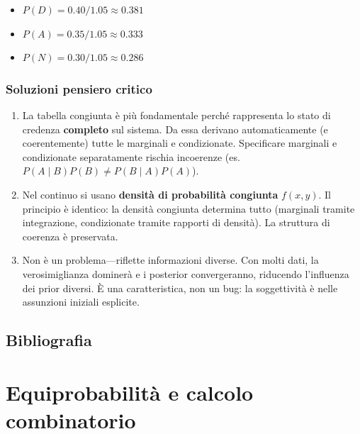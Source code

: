\documentclass[
  letterpaper,
  DIV=11,
  numbers=noendperiod,
  oneside]{scrreprt}
\providecommand{\tightlist}{%
  \setlength{\itemsep}{0pt}\setlength{\parskip}{0pt}}
\theoremstyle{definition}
\theoremstyle{plain}
\theoremstyle{definition}
\theoremstyle{remark}
\begin{document}
\begin{tcolorbox}
\begin{enumerate}
  \begin{itemize}
  \tightlist
  \item
    \(P(D) = 0.40 / 1.05 ≈ 0.381\)
  \item
    \(P(A) = 0.35 / 1.05 ≈ 0.333\)
  \item
    \(P(N) = 0.30 / 1.05 ≈ 0.286\)
  \end{itemize}
\end{enumerate}

\subsection{Soluzioni pensiero
critico}\label{soluzioni-pensiero-critico}

\begin{enumerate}
\def\labelenumi{\arabic{enumi}.}
\setcounter{enumi}{12}
\item
  La tabella congiunta è più fondamentale perché rappresenta lo stato di
  credenza \textbf{completo} sul sistema. Da essa derivano
  automaticamente (e coerentemente) tutte le marginali e condizionate.
  Specificare marginali e condizionate separatamente rischia incoerenze
  (es. \(P(A \mid B) P(B) \neq P(B \mid A) P(A)\)).
\item
  Nel continuo si usano \textbf{densità di probabilità congiunta}
  \(f(x, y)\). Il principio è identico: la densità congiunta determina
  tutto (marginali tramite integrazione, condizionate tramite rapporti
  di densità). La struttura di coerenza è preservata.
\item
  Non è un problema---riflette informazioni diverse. Con molti dati, la
  verosimiglianza dominerà e i posterior convergeranno, riducendo
  l'influenza dei prior diversi. È una caratteristica, non un bug: la
  soggettività è nelle assunzioni iniziali esplicite.
\end{enumerate}

\end{tcolorbox}

\section*{Bibliografia}\label{bibliografia-1}


\chapter{Equiprobabilità e calcolo
combinatorio}\label{sec-equiprobability-combinatorics}
\end{document}
